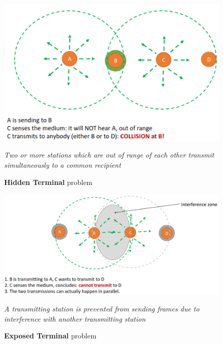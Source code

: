 \begin{figure}[htbp]
   \centering
   \includegraphics{images/hiddenterminal.png}
   \caption{\textbf{Hidden Terminal} problem}
   \textit{Two or more stations which are out of range of each other transmit simultaneously to a common
   recipient}
   \label{fig:hiddenterminal}
\end{figure}


\begin{figure}[htbp]
   \centering
   \includegraphics{images/exposedterminal.png}
   \caption{\textbf{Exposed Terminal} problem}
   \textit{A transmitting station is prevented from sending frames due to interference with another
   transmitting station}
   \label{fig:exposedterminal}
\end{figure}

\newpage

